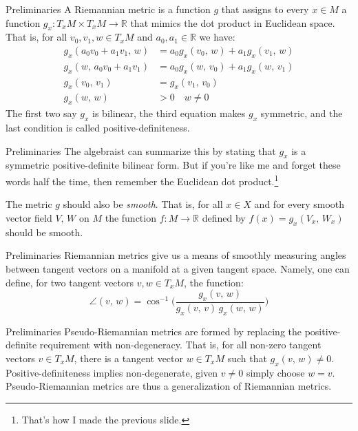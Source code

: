 \documentclass{beamer}
\begin{document}
    \begin{frame}{Preliminaries}
        A Riemannian metric is a function $g$ that assigns to every
        $x\in{M}$ a function $g_{x}:T_{x}M\times{T}_{x}M\rightarrow\mathbb{R}$
        that mimics the dot product in Euclidean space. That is, for all
        $v_{0},v_{1},w\in{T}_{x}M$ and $a_{0},a_{1}\in\mathbb{R}$ we have:
        \begin{align}
            g_{x}(a_{0}v_{0}+a_{1}v_{1},\,w)&=a_{0}g_{x}(v_{0},\,w)
                +a_{1}g_{x}(v_{1},\,w)\\
                g_{x}(w,\,a_{0}v_{0}+a_{1}v_{1})
            &=a_{0}g_{x}(w,\,v_{0})+a_{1}g_{x}(w,\,v_{1})\\
                g_{x}(v_{0},\,v_{1})&=g_{x}(v_{1},\,v_{0})\\
                g_{x}(w,\,w)&>{0}\quad{w}\ne{0}
        \end{align}
        The first two say $g_{x}$ is bilinear, the third equation makes $g_{x}$
        symmetric, and the last condition is called
        positive-definiteness.
    \end{frame}
    \begin{frame}{Preliminaries}
	    The algebraist can summarize this by stating that
        $g_{x}$ is a symmetric positive-definite bilinear form. But if you're
        like me and forget these words half the time, then remember the
        Euclidean dot product.\footnote{That's how I made the previous slide.}
        \par\hfill\par
    	The metric $g$ should also be \textit{smooth}. That is, for all
    	$x\in{X}$ and for every smooth vector field $V,\,W$ on $M$ the function
    	$f:M\rightarrow\mathbb{R}$ defined by $f(x)=g_{x}(V_{x},\,W_{x})$
    	should be smooth.
    \end{frame}
    \begin{frame}{Preliminaries}
        Riemannian metrics give us a means of smoothly measuring angles
        between tangent vectors on a manifold at a given tangent space. Namely,
        one can define, for two tangent vectors $v,w\in{T}_{x}M$, the function:
        \begin{equation}
            \angle(v,\,w)=\cos^{-1}\Big(
                \frac{g_{x}(v,\,w)}{g_{x}(v,\,v)\,g_{x}(w,\,w)}
            \Big)
        \end{equation}
    \end{frame}
    \begin{frame}{Preliminaries}
        Pseudo-Riemannian metrics are formed by replacing the
        positive-definite requirement with non-degeneracy. That is, for all
        non-zero tangent vectors $v\in{T}_{x}M$, there is a tangent vector
        $w\in{T}_{x}M$ such that $g_{x}(v,\,w)\ne{0}$. Positive-definiteness
        implies non-degenerate, given $v\ne{0}$ simply choose $w=v$.
        Pseudo-Riemannian metrics are thus a generalization of Riemannian
        metrics.
    \end{frame}
\end{document}

